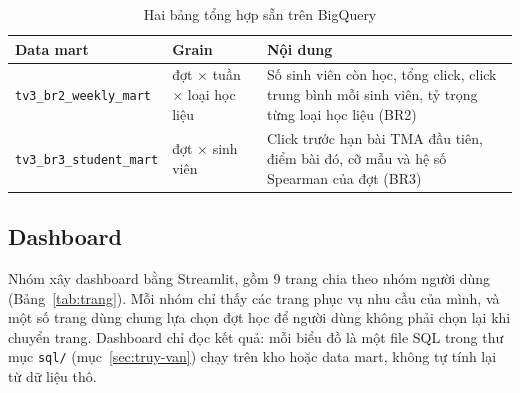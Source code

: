 \begin{table}[htbp]
\centering
\small
\begin{tabularx}{\textwidth}{|p{3.6cm}|p{3.4cm}|X|}
\hline
\textbf{Data mart} & \textbf{Grain} & \textbf{Nội dung} \\ \hline
\texttt{tv3\_br2\_weekly\_mart} & đợt $\times$ tuần $\times$ loại học liệu & Số sinh viên còn học, tổng click, click trung bình mỗi sinh viên, tỷ trọng từng loại học liệu (BR2) \\ \hline
\texttt{tv3\_br3\_student\_mart} & đợt $\times$ sinh viên & Click trước hạn bài TMA đầu tiên, điểm bài đó, cỡ mẫu và hệ số Spearman của đợt (BR3) \\ \hline
\end{tabularx}
\caption{Hai bảng tổng hợp sẵn trên BigQuery}
\label{tab:mart}
\end{table}

\subsection{Dashboard}
\label{sec:dashboard}

Nhóm xây dashboard bằng Streamlit, gồm 9 trang chia theo nhóm người dùng
(Bảng~\ref{tab:trang}). Mỗi nhóm chỉ thấy các trang phục vụ nhu cầu của mình, và một số trang
dùng chung lựa chọn đợt học để người dùng không phải chọn lại khi chuyển trang. Dashboard chỉ
đọc kết quả: mỗi biểu đồ là một file SQL trong thư mục \texttt{sql/} (mục~\ref{sec:truy-van})
chạy trên kho hoặc data mart, không tự tính lại từ dữ liệu thô.

\newpage


